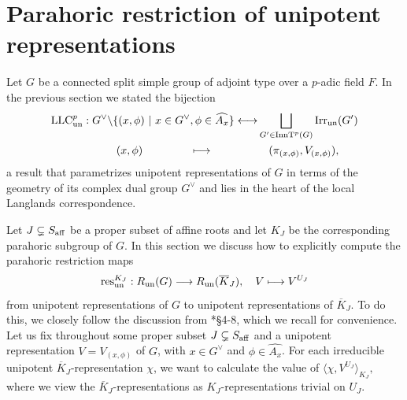 \section{Parahoric restriction of unipotent representations}\label{sec:parahoric_restriction}

Let $G$ be a connected split simple group of adjoint type over a $p$-adic field $F$. In the previous section we stated the bijection
\begin{align*}
    \mathrm{LLC}^p_{\mathrm{un}}: G^\vee\backslash\{(x,\phi)\ |\ x\in G^\vee, \phi\in\widehat{A_x}\}\longleftrightarrow&\bigsqcup_{G'\in\mathrm{InnT}^p(G)}\mathrm{Irr}_{\mathrm{un}}(G')\\
    (x,\phi)\hspace{1.5cm}\longmapsto \hspace{1.5cm}&\quad(\pi_{(x,\phi)},V_{(x,\phi)}),
\end{align*}
a result that parametrizes unipotent representations of $G$ in terms of the geometry of its complex dual group $G^\vee$ and lies in the heart of the local Langlands correspondence.

Let $J\subsetneq S_{\mathrm{aff}}$ be a proper subset of affine roots and let $K_J$ be the corresponding parahoric subgroup of $G$. In this section we discuss how to explicitly compute the parahoric restriction maps 
\[
    \mathrm{res}_{\mathrm{un}}^{K_J}:R_{\mathrm{un}}(G)\longrightarrow R_{\mathrm{un}}(\overline{K}_J), \quad V\longmapsto V^{U_J}
\]
from unipotent representations of $G$ to unipotent representations of $\overline{K}_J$. %
To do this, we closely follow the discussion from \cite{Reeder2000}*{\S4-8}, which we recall for convenience. Let us fix throughout some proper subset $J\subsetneq S_{\mathrm{aff}}$ and a unipotent representation $V=V_{(x,\phi)}$ of $G$, with $x\in G^\vee$ and $\phi\in\widehat{A_x}$. 
For each irreducible unipotent $\overline{K}_J$-representation $\chi$, we want to calculate the value of 
$\langle\chi,V^{U_J}\rangle_{K_J},$
where we view the $\overline{K}_J$-representations as $K_J$-representations trivial on $U_J$.

